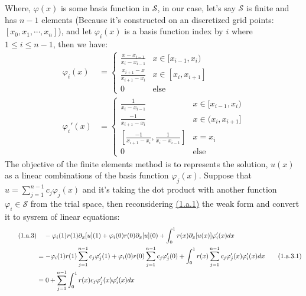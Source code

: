 \documentclass[]{article}
\begin{document}
        Where, $\varphi(x)$ is some basis function in $\mathcal{S}$, in our case, let's say $\mathcal{S}$ is finite and has $n - 1$ elements (Because it's constructed on an discretized grid points: $[x_0, x_1, \cdots, x_n]$), and let $\varphi_i(x)$ is a basis function index by $i$ where $1\le i \le n -1$, then we have: 
        \begin{align*}\tag{1.a.2}\label{eqn:1.a.2}
            \varphi_i(x) &= 
            \begin{cases}
                \frac{x - x_{i - 1}}{x_i - x_{i - 1}} & x\in [x_{i - 1}, x_i)
                \\
                \frac{x_{i + 1} - x}{x_{i + 1} - x_{i}} & x\in [x_{i}, x_{i + 1}]
                \\
                0 & \text{else}
            \end{cases}
            \\
            \varphi_i'(x) &= \begin{cases}
                \frac{1}{x_{i} - x_{i - 1}} & x \in [x_{i - 1}, x_i)
                \\
                \frac{-1}{x_{i + 1} - x_{i}} & x \in (x_{i}, x_{i + 1}]
                \\
                \left[
                    \frac{-1}{x_{i + 1} - x_i}, \frac{1}{x_i - x_{i - 1}}
                \right]
                & x = x_i
                \\
                0 & \text{else}
            \end{cases}
        \end{align*}
        The objective of the finite elements method is to represents the solution, $u(x)$ as a linear combinations of the basis function $\varphi_j(x)$. Suppose that $\hat{u} = \sum_{j = 1}^{n - 1}c_j \varphi_j(x)$ and it's taking the dot product with another function $\varphi_i \in \mathcal{S}$ from the trial space, then reconsidering \hyperref[eqn:1.a.1]{(1.a.1)} the weak form and convert it to sysrem of linear equations: 
        \begin{align*}\tag{1.a.3}\label{eqn:1.a.3}
            &\hspace{1.1em} 
            -\varphi_i(1)r(1)\partial_x[u](1) + \varphi_i(0)r(0)\partial_x[u](0)
            + 
            \int_{0}^{1} 
                r(x)\partial_x[u(x)]\varphi_i'(x)
            dx
            \\
            &= 
            - \varphi_i(1)r(1)
            \sum_{j = 1}^{n - 1}
                c_j\varphi'_j(1)
            +
            \varphi_i(0)r(0)
            \sum_{j = 1}^{n - 1}
                c_j\varphi'_j(0)
            +
            \int_{0}^{1} 
                r(x)
                \sum_{j = 1}^{n - 1}c_j\varphi_j'(x)
                \varphi_i'(x)
            dx \tag{1.a.3.1}
            \\
            &= 0 + \sum_{j = 1}^{n - 1}
                \int_{0}^{1} 
                    r(x)c_j\varphi_j'(x)\varphi_i'(x)
                dx
        \end{align*}
\end{document}
